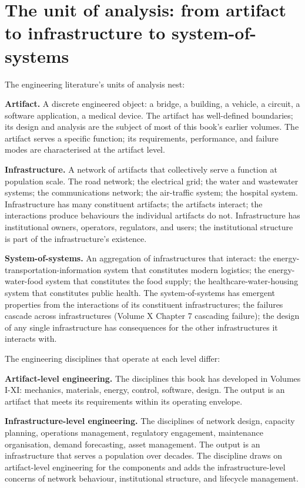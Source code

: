 \section{The unit of analysis: from artifact to infrastructure to system-of-systems}

The engineering literature's units of analysis nest:

\textbf{Artifact.} A discrete engineered object: a bridge, a building, a vehicle, a circuit, a software application, a medical device. The artifact has well-defined boundaries; its design and analysis are the subject of most of this book's earlier volumes. The artifact serves a specific function; its requirements, performance, and failure modes are characterised at the artifact level.

\textbf{Infrastructure.} A network of artifacts that collectively serve a function at population scale. The road network; the electrical grid; the water and wastewater systems; the communications network; the air-traffic system; the hospital system. Infrastructure has many constituent artifacts; the artifacts interact; the interactions produce behaviours the individual artifacts do not. Infrastructure has institutional owners, operators, regulators, and users; the institutional structure is part of the infrastructure's existence.

\textbf{System-of-systems.} An aggregation of infrastructures that interact: the energy-transportation-information system that constitutes modern logistics; the energy-water-food system that constitutes the food supply; the healthcare-water-housing system that constitutes public health. The system-of-systems has emergent properties from the interactions of its constituent infrastructures; the failures cascade across infrastructures (Volume X Chapter 7 cascading failure); the design of any single infrastructure has consequences for the other infrastructures it interacts with.

The engineering disciplines that operate at each level differ:

\textbf{Artifact-level engineering.} The disciplines this book has developed in Volumes I-XI: mechanics, materials, energy, control, software, design. The output is an artifact that meets its requirements within its operating envelope.

\textbf{Infrastructure-level engineering.} The disciplines of network design, capacity planning, operations management, regulatory engagement, maintenance organisation, demand forecasting, asset management. The output is an infrastructure that serves a population over decades. The discipline draws on artifact-level engineering for the components and adds the infrastructure-level concerns of network behaviour, institutional structure, and lifecycle management.

